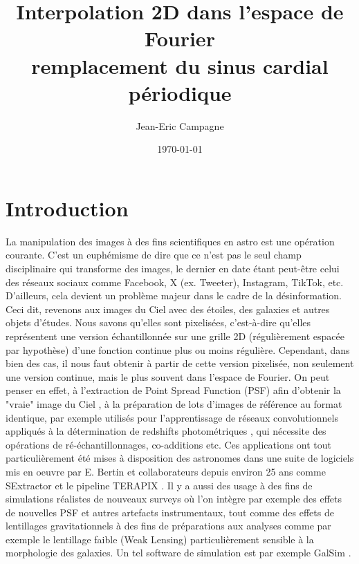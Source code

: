 \documentclass[11pt,twoside]{article}
\title{Interpolation 2D dans l'espace de Fourier \\ \small remplacement du sinus cardial périodique}
\author{Jean-Eric Campagne}
\date{\today}
\begin{document}
\maketitle
\renewcommand{\baselinestretch}{0.75}\normalsize
\tableofcontents
\renewcommand{\baselinestretch}{1.0}\normalsize

\section{Introduction}
\label{sec:Intro}
%
La manipulation des images à des fins scientifiques  en astro est une opération courante. C'est un euphémisme de dire que ce n'est pas le seul champ disciplinaire qui transforme des images, le dernier en date étant peut-être  celui des réseaux sociaux comme Facebook, X (ex. Tweeter), Instagram, TikTok, etc. D'ailleurs, cela devient un problème majeur dans le cadre de la désinformation. Ceci dit, revenons aux images du Ciel avec des étoiles, des galaxies et autres objets d'études. Nous savons qu'elles sont pixelisées, c'est-à-dire qu'elles représentent une version échantillonnée sur une grille 2D (régulièrement espacée par hypothèse) d'une fonction continue plus ou moins régulière. Cependant, dans bien des cas, il nous faut obtenir à partir de cette version pixelisée, non seulement une version continue, mais le plus souvent dans l'espace de Fourier. On peut penser en effet, à l'extraction de Point Spread Function (PSF) afin d'obtenir la "vraie" image du Ciel \citep{2011ASPC..442..435B}, à la préparation de lots d'images de référence au format identique, par exemple utilisés pour 
l'apprentissage de réseaux convolutionnels appliqués à la détermination de redshifts photométriques \citep{2019A&A...621A..26P}, qui nécessite des opérations de ré-échantillonnages, co-additions etc. Ces applications ont tout particulièrement été mises à disposition des astronomes dans une suite de logiciels mis en oeuvre par E. Bertin et collaborateurs depuis environ 25 ans comme \textsf{SExtractor} \citep{1996A&AS..117..393B} et  le pipeline \textsf{TERAPIX} \citep{2002ASPC..281..228B}. Il y a aussi des usage à des fins de simulations réalistes de nouveaux surveys où l'on intègre par exemple des effets de nouvelles PSF et autres artefacts instrumentaux, tout comme des effets de lentillages gravitationnels à des fins de préparations aux analyses comme par exemple le lentillage faible (Weak Lensing) particulièrement sensible à la morphologie des galaxies. Un tel software de simulation est par exemple \textsf{GalSim} \citep{2015A&C....10..121R}.
\end{document}
